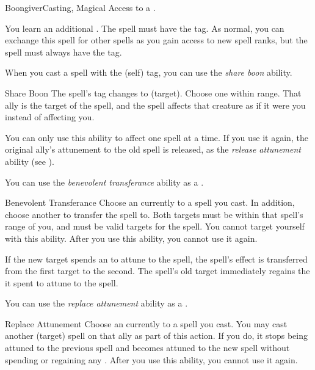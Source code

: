     \begin{feat}{Boongiver}{Casting, Magical}
        \featpre Access to a .

         You learn an additional .
        The spell must have the  tag.
        As normal, you can exchange this spell for other spells as you gain access to new spell ranks, but the spell must always have the  tag.

         When you cast a spell with the  (self) tag, you can use the \textit{share boon} ability.
        \begin{durationability}{Share Boon}
            The spell's  tag changes to  (target).
            Choose one  within \rngmed range.
            That ally is the target of the spell, and the spell affects that creature as if it were you instead of affecting you.

            You can only use this ability to affect one spell at a time.
            If you use it again, the original ally's attunement to the old spell is released, as the \textit{release attunement} ability (see ).
        \end{durationability}

         You can use the \textit{benevolent transferance} ability as a .
        \begin{instantability}{Benevolent Transferance}
            Choose an  currently  to a spell you cast.
            In addition, choose another  to transfer the spell to.
            Both targets must be within that spell's range of you, and must be valid targets for the spell.
            You cannot target yourself with this ability.
            After you use this ability, you  cannot use it again.

            If the new target spends an  to attune to the spell, the spell's effect is transferred from the first target to the second.
            The spell's old target immediately regains the  it spent to attune to the spell.
        \end{instantability}

         You can use the \textit{replace attunement} ability as a .
        \begin{instantability}{Replace Attunement}
            Choose an  currently  to a spell you cast.
            You may cast another  (target) spell on that ally as part of this action.
            If you do, it stops being attuned to the previous spell and becomes attuned to the new spell without spending or regaining any .
            After you use this ability, you  cannot use it again.
        \end{instantability}


\end{feat}
